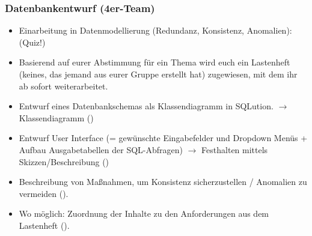{{\subsubsection*{Datenbankentwurf (4er-Team)}
\begin{itemize}
    \item Einarbeitung in Datenmodellierung (Redundanz, Konsistenz, Anomalien):  (Quiz!)
    \item Basierend auf eurer Abstimmung für ein Thema wird euch ein Lastenheft (keines, das jemand aus eurer Gruppe erstellt hat) zugewiesen, mit dem ihr ab sofort weiterarbeitet.
    \item Entwurf eines Datenbankschemas als Klassendiagramm in SQLution.
    $\rightarrow$ Klassendiagramm ()
    \item Entwurf User Interface (= gewünschte Eingabefelder und Dropdown Menüs + Aufbau Ausgabetabellen der SQL-Abfragen)
    $\rightarrow$ Festhalten mittels Skizzen/Beschreibung ()
    \item Beschreibung von Maßnahmen, um Konsistenz sicherzustellen / Anomalien zu vermeiden ().
    \item Wo möglich: Zuordnung der Inhalte zu den Anforderungen aus dem Lastenheft ().
\end{itemize}
}


}
